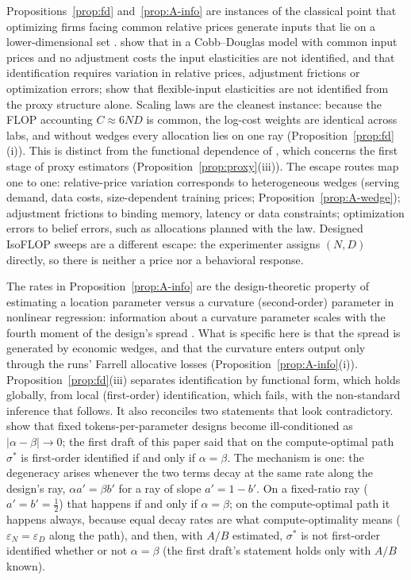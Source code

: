 \begin{remark}\label{rem:A-positioning}
Propositions~\ref{prop:fd} and~\ref{prop:A-info} are instances of the classical point that optimizing firms facing
common relative prices generate inputs that lie on a lower-dimensional set \citep{marschak1944random}.
\citet{bond2005adjustment} show that in a Cobb--Douglas model with common input prices and no adjustment costs the input
elasticities are not identified, and that identification requires variation in relative prices, adjustment frictions or
optimization errors; \citet{gandhi2020identification} show that flexible-input elasticities are not identified from the
proxy structure alone. Scaling laws are the cleanest instance: because the FLOP accounting $C\approx6ND$ is common, the
log-cost weights are identical across labs, and without wedges every allocation lies on one ray (Proposition~\ref{prop:fd}(i)).
This is distinct from the functional dependence of \citet{ackerberg2015identification}, which concerns the first stage of
proxy estimators (Proposition~\ref{prop:proxy}(iii)). The escape routes map one to one: relative-price variation
corresponds to heterogeneous wedges (serving demand, data costs, size-dependent training prices; Proposition~\ref{prop:A-wedge});
adjustment frictions to binding memory, latency or data constraints; optimization errors to belief errors, such as
allocations planned with the \citet{kaplan2020scaling} law. Designed IsoFLOP sweeps are a different escape: the
experimenter assigns $(N,D)$ directly, so there is neither a price nor a behavioral response.

The rates in Proposition~\ref{prop:A-info} are the design-theoretic property of estimating a location parameter versus a
curvature (second-order) parameter in nonlinear regression: information about a curvature parameter scales with the
fourth moment of the design's spread \citep{box1959design,kiefer1959optimum}. What is specific here is that the spread is
generated by economic wedges, and that the curvature enters output only through the runs' Farrell allocative losses
(Proposition~\ref{prop:A-info}(i)). Proposition~\ref{prop:fd}(iii) separates identification by functional form, which holds
globally, from local (first-order) identification, which fails, with the non-standard inference that follows. It also
reconciles two statements that look contradictory. \citet{kricheli2026tokens} show that fixed tokens-per-parameter designs
become ill-conditioned as $|\alpha-\beta|\to0$; the first draft of this paper said that on the compute-optimal path
$\sigma^*$ is first-order identified if and only if $\alpha=\beta$. The mechanism is one: the degeneracy arises whenever the two
terms decay at the same rate along the design's ray, $\alpha a'=\beta b'$ for a ray of slope $a'=1-b'$. On a fixed-ratio
ray ($a'=b'=\tfrac12$) that happens if and only if $\alpha=\beta$; on the compute-optimal path it happens always, because
equal decay rates are what compute-optimality means ($\varepsilon_N=\varepsilon_D$ along the path), and then, with $A/B$
estimated, $\sigma^*$ is not first-order identified whether or not $\alpha=\beta$ (the first draft's statement holds only
with $A/B$ known).


\end{remark}
